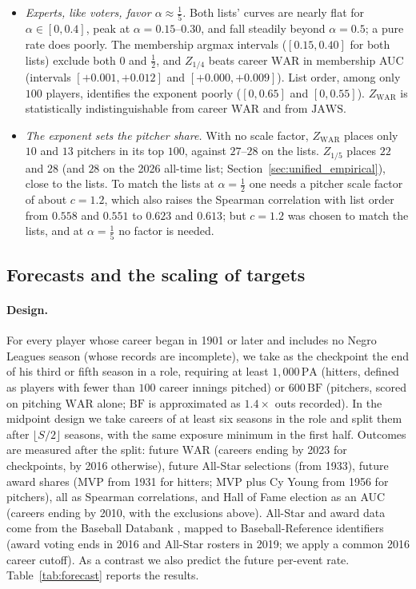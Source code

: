 \documentclass[11pt,letterpaper]{article}
\theoremstyle{plain}
\theoremstyle{definition}
\theoremstyle{remark}
\newcommand{\WAR}{\mathrm{WAR}}
\newcommand{\PA}{\mathrm{PA}}
\newcommand{\BF}{\mathrm{BF}}
\newcommand{\JAWS}{\mathrm{JAWS}}
\newcommand{\ZWAR}{Z_{\WAR}}
\begin{document}
\begin{itemize}
    \item \emph{Experts, like voters, favor $\alpha \approx \tfrac15$.} Both lists' curves are nearly flat for $\alpha \in [0, 0.4]$, peak at $\alpha = 0.15$--$0.30$, and fall steadily beyond $\alpha = 0.5$; a pure rate does poorly. The membership argmax intervals ($[0.15, 0.40]$ for both lists) exclude both $0$ and $\tfrac12$, and $Z_{1/4}$ beats career $\WAR$ in membership AUC (intervals $[+0.001, +0.012]$ and $[+0.000, +0.009]$). List order, among only $100$ players, identifies the exponent poorly ($[0, 0.65]$ and $[0, 0.55]$). $\ZWAR$ is statistically indistinguishable from career $\WAR$ and from $\JAWS$.
    \item \emph{The exponent sets the pitcher share.} With no scale factor, $\ZWAR$ places only $10$ and $13$ pitchers in its top $100$, against $27$--$28$ on the lists. $Z_{1/5}$ places $22$ and $28$ (and $28$ on the 2026 all-time list; Section~\ref{sec:unified_empirical}), close to the lists. To match the lists at $\alpha = \tfrac12$ one needs a pitcher scale factor of about $c = 1.2$, which also raises the Spearman correlation with list order from $0.558$ and $0.551$ to $0.623$ and $0.613$; but $c = 1.2$ was chosen to match the lists, and at $\alpha = \tfrac15$ no factor is needed.
\end{itemize}

\subsection{Forecasts and the scaling of targets}
\label{sec:forecast}

\paragraph{Design.} For every player whose career began in 1901 or later and includes no Negro Leagues season (whose records are incomplete), we take as the checkpoint the end of his third or fifth season in a role, requiring at least $1{,}000\,\PA$ (hitters, defined as players with fewer than $100$ career innings pitched) or $600\,\BF$ (pitchers, scored on pitching $\WAR$ alone; $\BF$ is approximated as $1.4\times$ outs recorded). In the midpoint design we take careers of at least six seasons in the role and split them after $\lfloor S/2 \rfloor$ seasons, with the same exposure minimum in the first half. Outcomes are measured after the split: future $\WAR$ (careers ending by 2023 for checkpoints, by 2016 otherwise), future All-Star selections (from 1933), future award shares (MVP from 1931 for hitters; MVP plus Cy Young from 1956 for pitchers), all as Spearman correlations, and Hall of Fame election as an AUC (careers ending by 2010, with the exclusions above). All-Star and award data come from the Baseball Databank \cite{lahman}, mapped to Baseball-Reference identifiers (award voting ends in 2016 and All-Star rosters in 2019; we apply a common 2016 career cutoff). As a contrast we also predict the future per-event rate. Table~\ref{tab:forecast} reports the results.
\end{document}
